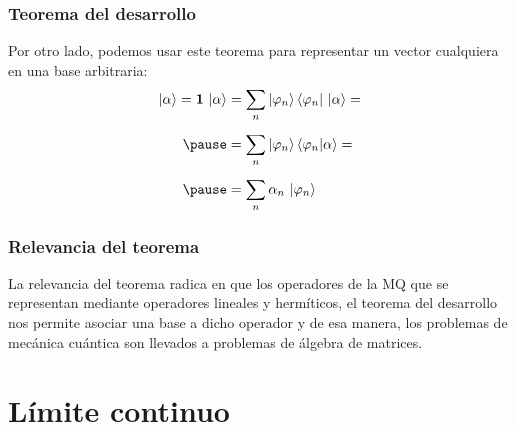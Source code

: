 \documentclass[12pt]{beamer}
\begin{document}
\begin{frame}
\frametitle{Teorema del desarrollo}
 Por otro lado, podemos usar este teorema para representar un vector cualquiera en una base arbitraria:
\begin{eqnarray}
\begin{aligned}[b]
\ket{\alpha} = \mathbf{1} \, \ket{\alpha} &= \sum_{n} \ket{\varphi_{n}} \bra{\varphi_{n}} \, \ket{\alpha} = \\[0.5em] \pause
&= \sum_{n} \ket{\varphi_{n}} \braket{\varphi_{n}}{\alpha} = \\[0.5em] \pause
&= \sum_{n} \alpha_{n} \, \ket{\varphi_{n}}
\end{aligned}
\label{eq:ecuacion_13}
\end{eqnarray}
\end{frame}
\begin{frame}
\frametitle{Relevancia del teorema}
La relevancia del teorema radica en que los operadores de la MQ que se representan mediante operadores lineales y hermíticos, el teorema del desarrollo nos permite asociar una base a dicho operador y de esa manera, los problemas de mecánica cuántica son llevados a problemas de álgebra de matrices.
\end{frame}
\section{Límite continuo}
\end{document}
